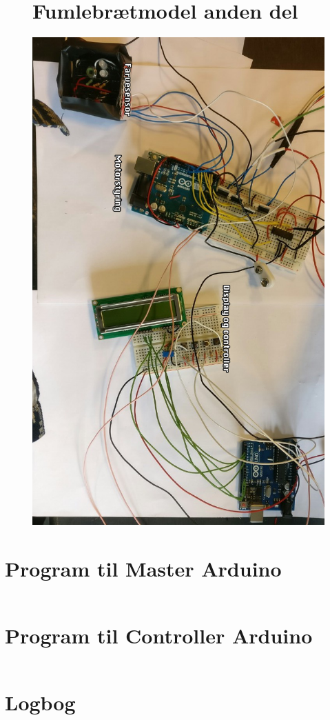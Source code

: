 \begin{figure}[H]
\section{Fumlebrætmodel anden del}
	\centering
    \includegraphics[width=13cm]{figures/2_5fremstilling/prototyper/rumleKreds.png}
\end{figure}


\section{Program til Master Arduino}
\label{bilag:programMaster}
\begin{lstlisting}

\end{lstlisting}

\section{Program til Controller Arduino}
\label{bilag:programController}
\begin{lstlisting}

\end{lstlisting}

\section{Logbog} 